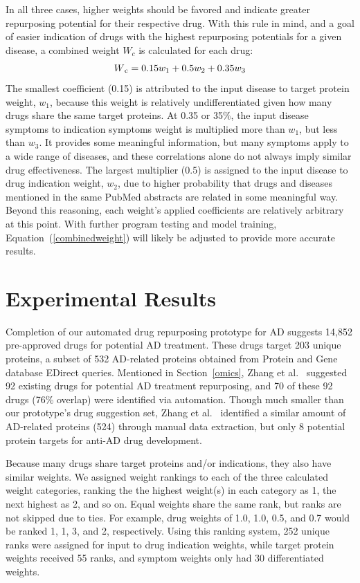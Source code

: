 \documentclass{IEEEtran}
\begin{document}
	In all three cases, higher weights should be favored and indicate greater repurposing potential for their respective drug.  With this rule in mind, and a goal of easier indication of drugs with the highest repurposing potentials for a given disease, a combined weight $W_{c}$ is calculated for each drug:
	\begin{equation}
	\label{combinedweight}
	W\textsubscript{c} = 0.15w_{1} + 0.5w_{2} + 0.35w_{3}
	\end{equation}
	The smallest coefficient (0.15) is attributed to the input disease to target protein weight, $w_{1}$, because this weight is relatively undifferentiated given how many drugs share the same target proteins.  At 0.35 or 35\%, the input disease symptoms to indication symptoms weight is multiplied more than $w_{1}$, but less than $w_{3}$.  It provides some meaningful information, but many symptoms apply to a wide range of diseases, and these correlations alone do not always imply similar drug effectiveness.  The largest multiplier (0.5) is assigned to the input disease to drug indication weight, $w_{2}$, due to higher probability that drugs and diseases mentioned in the same PubMed abstracts are related in some meaningful way.  Beyond this reasoning, each weight's applied coefficients are relatively arbitrary at this point.  With further program testing and model training, Equation~(\ref{combinedweight}) will likely be adjusted to provide more accurate results.
	
	\section{Experimental Results}
	Completion of our automated drug repurposing prototype for AD suggests 14,852 pre-approved drugs for potential AD treatment.  These drugs target 203 unique proteins, a subset of 532 AD-related proteins obtained from Protein and Gene database EDirect queries.  Mentioned in Section~\ref{omics}, Zhang et al.~\cite{zhang16} suggested 92 existing drugs for potential AD treatment repurposing, and 70 of these 92 drugs (76\% overlap) were identified via automation. Though much smaller than our prototype's drug suggestion set, Zhang et al.~\cite{zhang16} identified a similar amount of AD-related proteins (524) through manual data extraction, but only 8 potential protein targets for anti-AD drug development.  
	
	Because many drugs share target proteins and/or indications, they also have similar weights. We assigned weight rankings to each of the three calculated weight categories, ranking the the highest weight(s) in each category as 1, the next highest as 2, and so on. Equal weights share the same rank, but ranks are not skipped due to ties.  For example, drug weights of 1.0, 1.0, 0.5, and 0.7 would be ranked 1, 1, 3, and 2, respectively.  Using this ranking system, 252 unique ranks were assigned for input to drug indication weights, while target protein weights received 55 ranks, and symptom weights only had 30 differentiated weights.  
	
\end{document}
